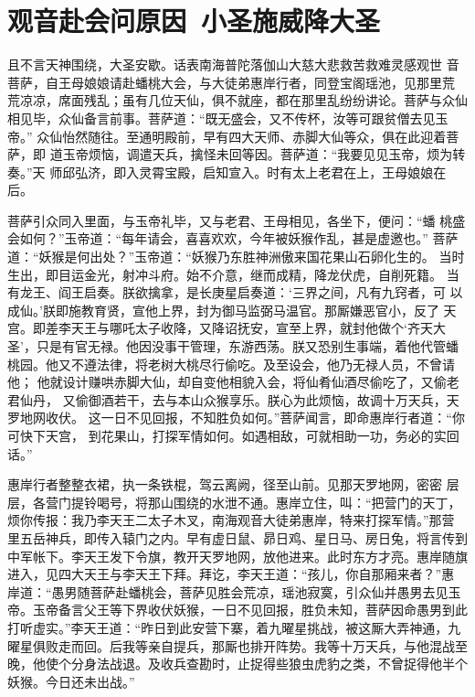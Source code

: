 \chapter{观音赴会问原因~小圣施威降大圣}

且不言天神围绕，大圣安歇。话表南海普陀落伽山大慈大悲救苦救难灵感观世
音菩萨，自王母娘娘请赴蟠桃大会，与大徒弟惠岸行者，同登宝阁瑶池，见那里荒
荒凉凉，席面残乱；虽有几位天仙，俱不就座，都在那里乱纷纷讲论。菩萨与众仙
相见毕，众仙备言前事。菩萨道：“既无盛会，又不传杯，汝等可跟贫僧去见玉帝。”
众仙怡然随往。至通明殿前，早有四大天师、赤脚大仙等众，俱在此迎着菩萨，即
道玉帝烦恼，调遣天兵，擒怪未回等因。菩萨道：“我要见见玉帝，烦为转奏。”天
师邱弘济，即入灵霄宝殿，启知宣入。时有太上老君在上，王母娘娘在后。

菩萨引众同入里面，与玉帝礼毕，又与老君、王母相见，各坐下，便问：“蟠
桃盛会如何？”玉帝道：“每年请会，喜喜欢欢，今年被妖猴作乱，甚是虚邀也。”
菩萨道：“妖猴是何出处？”玉帝道：“妖猴乃东胜神洲傲来国花果山石卵化生的。
当时生出，即目运金光，射冲斗府。始不介意，继而成精，降龙伏虎，自削死籍。
当有龙王、阎王启奏。朕欲擒拿，是长庚星启奏道：‘三界之间，凡有九窍者，可
以成仙。’朕即施教育贤，宣他上界，封为御马监弼马温官。那厮嫌恶官小，反了
天宫。即差李天王与哪吒太子收降，又降诏抚安，宣至上界，就封他做个‘齐天大
圣’，只是有官无禄。他因没事干管理，东游西荡。朕又恐别生事端，着他代管蟠
桃园。他又不遵法律，将老树大桃尽行偷吃。及至设会，他乃无禄人员，不曾请他；
他就设计赚哄赤脚大仙，却自变他相貌入会，将仙肴仙酒尽偷吃了，又偷老君仙丹，
又偷御酒若干，去与本山众猴享乐。朕心为此烦恼，故调十万天兵，天罗地网收伏。
这一日不见回报，不知胜负如何。”菩萨闻言，即命惠岸行者道：“你可快下天宫，
到花果山，打探军情如何。如遇相敌，可就相助一功，务必的实回话。”

惠岸行者整整衣裙，执一条铁棍，驾云离阙，径至山前。见那天罗地网，密密
层层，各营门提铃喝号，将那山围绕的水泄不通。惠岸立住，叫：“把营门的天丁，
烦你传报：我乃李天王二太子木叉，南海观音大徒弟惠岸，特来打探军情。”那营
里五岳神兵，即传入辕门之内。早有虚日鼠、昴日鸡、星日马、房日兔，将言传到
中军帐下。李天王发下令旗，教开天罗地网，放他进来。此时东方才亮。惠岸随旗
进入，见四大天王与李天王下拜。拜讫，李天王道：“孩儿，你自那厢来者？”惠
岸道：“愚男随菩萨赴蟠桃会，菩萨见胜会荒凉，瑶池寂寞，引众仙并愚男去见玉
帝。玉帝备言父王等下界收伏妖猴，一日不见回报，胜负未知，菩萨因命愚男到此
打听虚实。”李天王道：“昨日到此安营下寨，着九曜星挑战，被这厮大弄神通，九
曜星俱败走而回。后我等亲自提兵，那厮也排开阵势。我等十万天兵，与他混战至
晚，他使个分身法战退。及收兵查勘时，止捉得些狼虫虎豹之类，不曾捉得他半个
妖猴。今日还未出战。”

